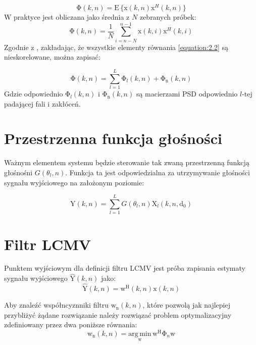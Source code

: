 \begin{equation}
    \label{equation:PSD matrix}
    \bm{\mathrm{\Phi}}(k,n) = \mathrm{E} \, \{\bm{\mathrm{x}}(k,n) \bm{\mathrm{x}}^{H}(k,n)\}
\end{equation}
W praktyce jest obliczana jako średnia z $N$ zebranych próbek:
\begin{equation}
    \label{equation: PSD in practice}
    \bm{\mathrm{\Phi}}(k,n)=
    \dfrac{1}{N} \sum_{i = n-N}^{n-1}
    \bm{\mathrm{x}}(k,i) \bm{\mathrm{x}}^{H}(k,i)
\end{equation}
Zgodnie z \cite{Thiergart2013}, zakładając, że wszystkie elementy równania \ref{equation:2.2} są nieskorelowane, można zapisać:

\begin{equation}
    \label{equation:PSD signal noise}
    \bm{\mathrm{\Phi}}(k,n) = 
    \sum_{l=1}^{L} \bm{\mathrm{\Phi}}_{l}(k,n) +
    \bm{\mathrm{\Phi}}_{\mathrm{n}}(k,n)
\end{equation}
Gdzie odpowiednio $\bm{\mathrm{\Phi}}_{l}(k,n)$ i $\bm{\mathrm{\Phi}}_{\mathrm{n}}(k,n)$ są macierzami PSD odpowiednio $l$-tej padającej fali i zakłóceń.

\section{Przestrzenna funkcja głośności}

Ważnym elementem systemu będzie sterowanie tak zwaną przestrzenną funkcją głośnośni $G(\theta_{l},n)$. Funkcja ta jest odpowiedzialna za utrzymywanie głośności sygnału wyjściowego na założonym poziomie:

\begin{equation}
    \label{equation:G}
    \mathrm{Y}(k,n)= 
    \sum_{l=1}^{L} G(\theta_{l},n)
    \mathrm{X}_{l}(k,n,\bm{\mathrm{d}}_0)
\end{equation}

\section{Filtr LCMV}

Punktem wyjściowym dla definicji filtru LCMV jest próba zapisania estymaty sygnału wyjściowego $\hat{\mathrm{Y}}(k,n)$ jako:
\begin{equation}
    \label{equation:Y estimation}
    \hat{\mathrm{Y}}(k,n)=
    \bm{\mathrm{w}}^{\mathrm{H}}(k,n)
    \bm{\mathrm{x}}(k,n)
\end{equation}

\noindent Aby znaleźć współncyznniki filtru $\bm{\mathrm{w}}_{\mathrm{n}}(k,n)$, które pozwolą jak najlepiej przybliżyć żądane rozwiązanie należy rozwiązać problem optymalizacyjny zdefiniowany przez dwa poniższe równania:
\begin{equation}
    \label{equation:argmin}
    \bm{\mathrm{w}}_{\mathrm{n}}(k,n) = 
    \underset{\bm{\mathrm{w}}}{\mathrm{arg \, min}} \,
    \bm{\mathrm{w}}^{\mathrm{H}}
    \bm{\mathrm{\Phi}}_{n}
    \bm{\mathrm{w}}
\end{equation}

